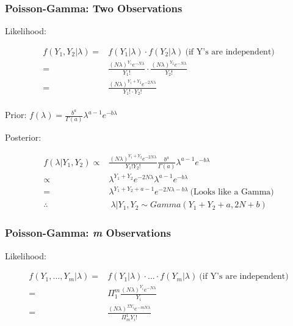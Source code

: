 \documentclass[11pt]{article}
\begin{document}
\subsubsection{Poisson-Gamma: Two Observations}
\label{sec:org7e7c946}

Likelihood:

\begin{equation}
\begin{split}
f(Y_1, Y_2 | \lambda) = & f(Y_1 | \lambda) \cdot f(Y_2 | \lambda) \ \text{(if Y's are independent)}\\
= & \frac{(N \lambda)^{Y_1} e^{-N \lambda}}{Y_1 !} \cdot \frac{(N \lambda)^{Y_2} e^{-N \lambda}}{Y_2 !}\\
= & \frac{(N \lambda)^{Y_1 + Y_2} e^{-2N \lambda}}{Y_1 ! \cdot Y_2 !}\\
\end{split}
\end{equation}

Prior: \(f(\lambda) = \frac{b^a}{\Gamma (a)} \lambda^{a - 1} e^{-b \lambda}\)

Posterior:

\begin{equation}
\begin{split}
f(\lambda | Y_1, Y_2) \propto & \frac{(N \lambda)^{Y_1 + Y_2} e^{-2N \lambda}}{Y_1 ! Y_2 !} \frac{b^a}{\Gamma (a)} \lambda^{a - 1} e^{-b \lambda}\\
\propto & \lambda^{Y_1 + Y_2} e^{-2N \lambda} \lambda^{a - 1} e^{-b \lambda}\\
= & \lambda^{Y_1 + Y_2 + a - 1} e^{- 2 N \lambda - b \lambda} \ \text{(Looks like a Gamma)}\\
\therefore & \ \lambda | Y_1, Y_2 \sim Gamma(Y_1 + Y_2 + a, 2 N + b)
\end{split}
\end{equation}

\subsubsection{Poisson-Gamma: \emph{m} Observations}
\label{sec:org5f0301f}

Likelihood:

\begin{equation}
\begin{split}
f(Y_1, ..., Y_m | \lambda) = & f(Y_1 | \lambda) \cdot ... \cdot f(Y_m | \lambda) \ \text{(if Y's are independent)}\\
= & \Pi^{m}_{1} \frac{(N \lambda)^{Y_i} e^{-N \lambda}}{Y_i }\\
= & \frac{(N \lambda)^{\Sigma Y_i} e^{-m N \lambda}}{\Pi^{1}_{m} Y_i !}\\
\end{split}
\end{equation}
\end{document}
